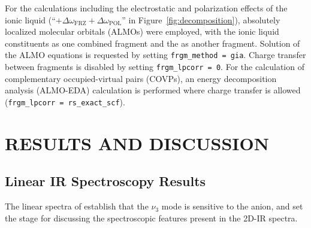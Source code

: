 \documentclass[%
  class = book,%
  crop = false,%
  float = true,%
  multi = true,%
  preview = false,%
]{standalone}
\let\cite\autocite
\newcommand{\caps}[1]{\uppercase{#1}}
\begin{document}
{For the calculations including the electrostatic and polarization effects of the ionic liquid  (``\(+ \Delta \omega_\mathrm{FRZ} + \Delta \omega_\mathrm{POL}\)'' in Figure~\ref{fig:decomposition}), absolutely localized molecular orbitals (ALMOs)\cite{Khaliullin2006} were employed, with the ionic liquid constituents as one combined fragment and the  as another fragment. Solution of the ALMO equations is requested by setting \verb!frgm_method = gia!. Charge transfer between fragments is disabled by setting \verb!frgm_lpcorr = 0!. For the calculation of complementary occupied-virtual pairs (COVPs), an energy decomposition analysis (ALMO-EDA) calculation is performed where charge transfer is allowed (\verb!frgm_lpcorr = rs_exact_scf!).

\section{\texorpdfstring{\caps{Results and Discussion}}{Results and Discussion}}

\subsection{Linear IR Spectroscopy Results}
\label{sec:anions_linear}

The linear spectra of  establish that the  \(\nu_3\) mode is sensitive to the anion, and set the stage for discussing the spectroscopic features present in the 2D-IR spectra.

}
\end{document}
